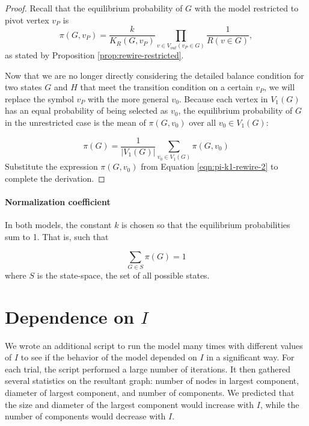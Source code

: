 \documentclass[a4paper,10pt]{article}
\begin{document}
\begin{proof}
Recall that the equilibrium probability of $G$ with the model restricted to pivot vertex $v_P$ is
 \begin{equation}
 \label{eqn:pi-k1-rewire-2}
  \pi(G, v_P) = \frac{k}{K_R(G, v_P)} 
 \prod \limits_{v \in V_{out}(v_P \in G)} \frac{1}{R(v \in G)},
 \end{equation}
as stated by Proposition \ref{prop:rewire-restricted}.

Now that we are no longer directly considering the detailed balance condition for two states $G$ and $H$ that meet the transition condition on a certain $v_P$, we will replace the symbol $v_P$ with the more general $v_0$. Because each vertex in $V_1(G)$ has an equal probability of being selected as $v_0$, the equilibrium probability of $G$ in the unrestricted case is the mean of $\pi(G, v_0)$ over all $v_0 \in V_1(G)$:

\begin{equation}
   \pi(G) = \frac{1}{|V_1(G)|} \sum\limits_{v_0 \in V_1(G)} 
 \pi(G, v_0)
\end{equation}
Substitute the expression $\pi(G, v_0)$ from Equation \ref{eqn:pi-k1-rewire-2} to complete the derivation.

\end{proof}

\paragraph{Normalization coefficient}
In both models, the constant $k$ is chosen so that the equilibrium probabilities sum to 1. That is, such that

\begin{equation}
 \sum\limits_{G \in S} \pi(G) = 1
\end{equation}
where $S$ is the state-space, the set of all possible states.

\section{Dependence on $I$}

We wrote an additional script to run the model many times with different values of $I$ to see if the behavior of the model depended on $I$ in a significant way. For each trial, the script performed a large number of iterations. It then gathered several statistics on the resultant graph: number of nodes in largest component, diameter of largest component, and number of components. We predicted that the size and diameter of the largest component would increase with $I$, while the number of components would decrease with $I$. 
\end{document}
